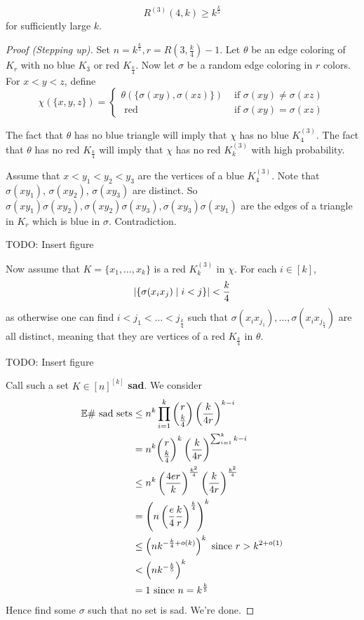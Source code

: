 \documentclass{article}
\begin{document}
\begin{thm}
  $$R^{(3)}(4, k) \ge k^{\frac k5}$$
  for sufficiently large $k$.
\end{thm}
\begin{proof}[Proof (Stepping up)]
  Set $n = k^{\frac k5}, r = R(3, \frac k4) - 1$. Let $\theta$ be an edge coloring of $K_r$ with no blue $K_3$ or red $K_{\frac k4}$. Now let $\sigma$ be a random edge coloring in $r$ colors. For $x < y < z$, define
  $$\chi(\{x, y, z\}) =
  \begin{cases}
    \theta(\{\sigma(xy), \sigma(xz)\}) & \text{ if } \sigma(xy) \ne \sigma(xz) \\
    \text{ red} & \text{ if } \sigma(xy) = \sigma(xz)
  \end{cases}$$
  \begin{idea}
    The fact that $\theta$ has no blue triangle will imply that $\chi$ has no blue $K_4^{(3)}$. The fact that $\theta$ has no red $K_{\frac k4}$ will imply that $\chi$ has no red $K_k^{(3)}$ with high probability.
  \end{idea}
  Assume that $x < y_1 < y_2 < y_3$ are the vertices of a blue $K_4^{(3)}$. Note that $\sigma(xy_1)$, $\sigma(xy_2)$, $\sigma(xy_3)$ are distinct. So $\sigma(xy_1)\sigma(xy_2), \sigma(xy_2)\sigma(xy_3), \sigma(xy_3)\sigma(xy_1)$ are the edges of a triangle in $K_r$ which is blue in $\sigma$. Contradiction.
  
  TODO: Insert figure

  Now assume that $K = \{x_1, \dots, x_k\}$ is a red $K_k^{(3)}$ in $\chi$. For each $i \in [k]$,
  $$\left\lvert \{\sigma(x_ix_j) \mid i < j\}\right\rvert < \frac k4$$
  as otherwise one can find $i < j_1 < \dots < j_{\frac k4}$ such that $\sigma(x_ix_{j_1}), \dots, \sigma(x_ix_{j_{\frac k4}})$ are all distinct, meaning that they are vertices of a red $K_{\frac k4}$ in $\theta$.
  
  TODO: Insert figure

  Call such a set $K \in [n]^{[k]}$ {\bf sad}. We consider
  \begin{align*}
    \mathbb E \#\text{ sad sets}
    & \le n^k \prod_{i = 1}^k \binom r{\frac k4} \left(\frac k{4r}\right)^{k - i} \\
    & = n^k \binom r{\frac k4}^k \left(\frac k{4r}\right)^{\sum_{i = 1}^k k - i} \\
    & \le n^k \left(\frac{4er}k\right)^{\frac{k^2}4} \left(\frac k{4r}\right)^{\frac{k^2}4} \\
    & = \left(n\left(\frac e4 \frac kr\right)^{\frac k4}\right)^k \\
    & \le \left(nk^{-\frac k4 + o(k)}\right)^k \text{ since } r > k^{2 + o(1)} \\
    & < \left(nk^{-\frac k5}\right)^k \\
    & = 1 \text{ since } n = k^{\frac k5}
  \end{align*}
  Hence find some $\sigma$ such that no set is sad. We're done.
\end{proof}

\newlec

\printindex
\end{document}
